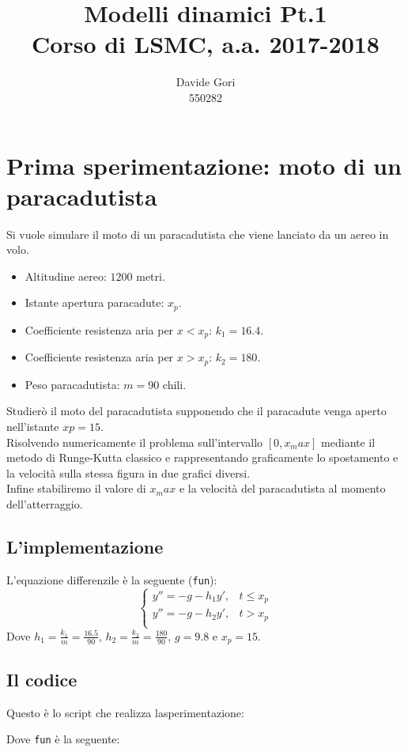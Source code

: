 \documentclass{article}
\title{Modelli dinamici Pt.1\\
	Corso di LSMC, a.a. 2017-2018}
\author{Davide Gori\\
	550282}
\begin{document}
	\maketitle
	\section{Prima sperimentazione: moto di un paracadutista}
	Si vuole simulare il moto di un paracadutista che viene lanciato da un aereo in volo.
	\begin{itemize}
		\item Altitudine aereo: $1200$ metri.
		\item Istante apertura paracadute: $x_p$.
		\item Coefficiente resistenza aria per $x<x_p$: $k_1=16.4$.
		\item Coefficiente resistenza aria per $x>x_p$: $k_2=180$.
		\item Peso paracadutista: $m=90$ chili.
		
	\end{itemize}
	Studierò il moto del paracadutista supponendo che il paracadute venga aperto nell’istante $xp = 15$.\\
	Risolvendo numericamente il problema sull'intervallo $\left[0, x_max\right]$ mediante il metodo di Runge-Kutta classico e rappresentando graficamente lo spostamento e la velocità sulla stessa figura in due grafici diversi.\\
	Infine stabiliremo il valore di $x_max$ e la velocità del paracadutista al momento dell'atterraggio.\\
	\subsection{L'implementazione}
	L'equazione differenzile è la seguente ({\tt fun}):
	\begin{equation}
	\begin{cases}
	y''= -g-h_1 y' , & t \leq x_p\\
	y''= -g-h_2 y' , & t > x_p\\
	\end{cases}
	\end{equation}
	Dove $h_1=\frac{k_1}{m}=\frac{16.5}{90}$, $h_2=\frac{k_2}{m}=\frac{180}{90}$, $g=9.8$ e $x_p=15$.
	\subsection{Il codice}
	Questo è lo script che realizza lasperimentazione:
	
	Dove {\tt fun} è la seguente:
	
\end{document}
